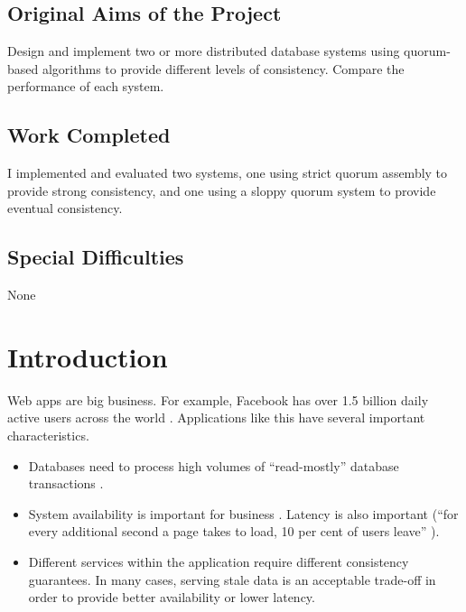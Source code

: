 \documentclass[12pt,a4paper,twoside,openany]{report}
\begin{document}

\section*{Original Aims of the Project}

Design and implement two or more distributed database systems using quorum-based algorithms to provide different levels of consistency. Compare the performance of each system.

\section*{Work Completed}

I implemented and evaluated two systems, one using strict quorum assembly to provide strong consistency, and one using a sloppy quorum system to provide eventual consistency.

\section*{Special Difficulties}

None

\tableofcontents



\pagestyle{headings}

\chapter{Introduction}

Web apps are big business. For example, Facebook has over 1.5 billion daily active users across the world \cite{facebook}. Applications like this have several important characteristics.

\begin{itemize}
\item
Databases need to process high volumes of ``read-mostly'' database transactions \cite{fox1999harvest} \cite{nunemaker}.

\item
System availability is important for business \cite{decandia2007dynamo}. Latency is also important (``for every additional second a page takes to load, 10 per cent of users leave'' \cite{clark_2018}).

\item
Different services within the application require different consistency guarantees. In many cases, serving stale data is an acceptable trade-off in order to provide better availability or lower latency.

\end{itemize}
\end{document}
